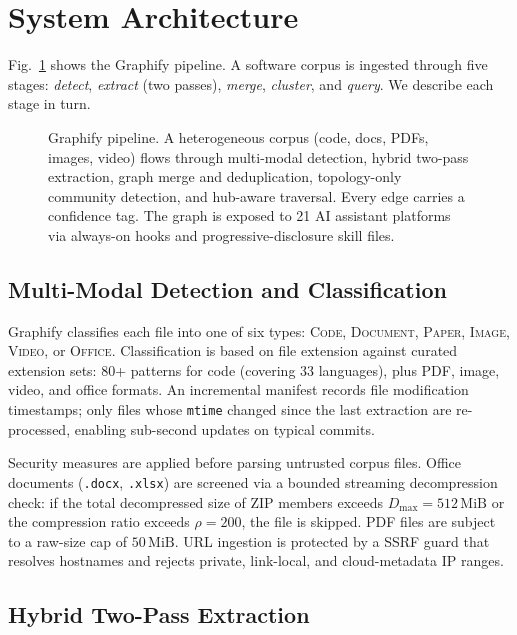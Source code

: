 \section{System Architecture}
\label{sec:system}

Fig.~\ref{fig:arch} shows the Graphify pipeline. A software corpus is ingested
through five stages: \emph{detect}, \emph{extract} (two passes), \emph{merge},
\emph{cluster}, and \emph{query}. We describe each stage in turn.

\begin{figure}[t]
  \centering
  
  \caption{Graphify pipeline. A heterogeneous corpus (code, docs, PDFs, images,
           video) flows through multi-modal detection, hybrid two-pass extraction,
           graph merge and deduplication, topology-only community detection, and
           hub-aware traversal. Every edge carries a confidence tag.
           The graph is exposed to 21 AI assistant platforms via always-on hooks
           and progressive-disclosure skill files.}
  \label{fig:arch}
\end{figure}

\subsection{Multi-Modal Detection and Classification}

Graphify classifies each file into one of six types: \textsc{Code},
\textsc{Document}, \textsc{Paper}, \textsc{Image}, \textsc{Video}, or
\textsc{Office}. Classification is based on file extension against curated
extension sets: 80+ patterns for code (covering 33 languages), plus PDF,
image, video, and office formats. An incremental manifest records file
modification timestamps; only files whose \texttt{mtime} changed since the
last extraction are re-processed, enabling sub-second updates on typical commits.

Security measures are applied before parsing untrusted corpus files. Office
documents (\texttt{.docx}, \texttt{.xlsx}) are screened via a bounded
streaming decompression check: if the total decompressed size of ZIP members
exceeds $D_{\max} = 512\,\text{MiB}$ or the compression ratio exceeds $\rho =
200$, the file is skipped. PDF files are subject to a raw-size cap of
$50\,\text{MiB}$. URL ingestion is protected by a SSRF guard that resolves
hostnames and rejects private, link-local, and cloud-metadata IP ranges.

\subsection{Hybrid Two-Pass Extraction}

